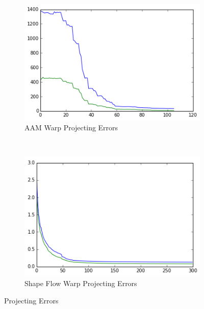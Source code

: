 \begin{figure}[h!]
    \centering
    \begin{subfigure}[b]{0.2\textwidth}
            \includegraphics[width=\textwidth]{resources/warp_projecting_error_aam}
        \caption{AAM Warp Projecting Errors}
        \label{}
    \end{subfigure}
    ~~
    \begin{subfigure}[b]{0.2\textwidth}
            \includegraphics[width=\textwidth]{resources/warp_projecting_error_of}
        \caption{Shape Flow Warp Projecting Errors}
    \end{subfigure}
    \caption{Projecting Errors}
\end{figure}

\clearpage